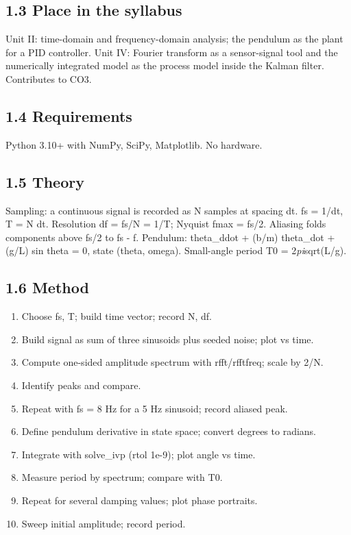 \documentclass[
]{article}
\providecommand{\tightlist}{%
  \setlength{\itemsep}{0pt}\setlength{\parskip}{0pt}}
\begin{document}
\subsection{1.3 Place in the syllabus}\label{place-in-the-syllabus}

Unit II: time-domain and frequency-domain analysis; the pendulum as the
plant for a PID controller. Unit IV: Fourier transform as a
sensor-signal tool and the numerically integrated model as the process
model inside the Kalman filter. Contributes to CO3.

\subsection{1.4 Requirements}\label{requirements}

Python 3.10+ with NumPy, SciPy, Matplotlib. No hardware.

\subsection{1.5 Theory}\label{theory}

Sampling: a continuous signal is recorded as N samples at spacing dt. fs
= 1/dt, T = N dt. Resolution df = fs/N = 1/T; Nyquist fmax = fs/2.
Aliasing folds components above fs/2 to \textbar fs - f\textbar.
Pendulum: theta\_ddot + (b/m) theta\_dot + (g/L) sin theta = 0, state
(theta, omega). Small-angle period T0 = 2\emph{pi}sqrt(L/g).

\subsection{1.6 Method}\label{method}

\begin{enumerate}
\def\labelenumi{\arabic{enumi}.}
\tightlist
\item
  Choose fs, T; build time vector; record N, df.
\item
  Build signal as sum of three sinusoids plus seeded noise; plot vs
  time.
\item
  Compute one-sided amplitude spectrum with rfft/rfftfreq; scale by 2/N.
\item
  Identify peaks and compare.
\item
  Repeat with fs = 8 Hz for a 5 Hz sinusoid; record aliased peak.
\item
  Define pendulum derivative in state space; convert degrees to radians.
\item
  Integrate with solve\_ivp (rtol 1e-9); plot angle vs time.
\item
  Measure period by spectrum; compare with T0.
\item
  Repeat for several damping values; plot phase portraits.
\item
  Sweep initial amplitude; record period.
\end{enumerate}
\end{document}
